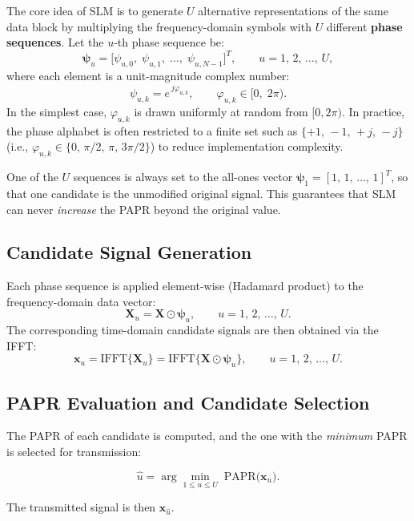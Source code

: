 The core idea of SLM is to generate $U$ alternative representations of the
same data block by multiplying the frequency-domain symbols with $U$ different
\textbf{phase sequences}.  Let the $u$-th phase sequence be:
\begin{equation*}
    \bm{\psi}_u = \bigl[\psi_{u,0},\;\psi_{u,1},\;\dots,\;\psi_{u,N-1}\bigr]^T,
    \qquad u = 1,\,2,\,\dots,\,U,
\end{equation*}
where each element is a unit-magnitude complex number:
\begin{equation*}
    \psi_{u,k} = e^{\,j\varphi_{u,k}},
    \qquad \varphi_{u,k} \in [0,\;2\pi).
\end{equation*}
In the simplest case, $\varphi_{u,k}$ is drawn uniformly at random
from $[0,2\pi)$.  In practice, the phase alphabet is often
restricted to a finite set such as $\{+1,\,-1,\,+j,\,-j\}$
(i.e., $\varphi_{u,k} \in \{0,\, \pi/2,\, \pi,\, 3\pi/2\}$)
to reduce implementation complexity.

\begin{keyinsight}
    One of the $U$ sequences is always set to the all-ones vector
    $\bm{\psi}_1 = [1,\,1,\,\dots,\,1]^T$, so that one candidate is the
    unmodified original signal.  This guarantees that SLM can never
    \emph{increase} the PAPR beyond the original value.
\end{keyinsight}

\subsection{Candidate Signal Generation}

Each phase sequence is applied element-wise (Hadamard product) to the
frequency-domain data vector:
\begin{equation*}
    \bm{X}_u = \bm{X} \odot \bm{\psi}_u,
    \qquad u = 1,\,2,\,\dots,\,U.
\end{equation*}
The corresponding time-domain candidate signals are then obtained via the
IFFT:
\begin{equation*}
    \bm{x}_u = \mathrm{IFFT}\{\bm{X}_u\}
             = \mathrm{IFFT}\{\bm{X} \odot \bm{\psi}_u\},
    \qquad u = 1,\,2,\,\dots,\,U.
\end{equation*}

\subsection{PAPR Evaluation and Candidate Selection}

The PAPR of each candidate is computed, and the one with the
\emph{minimum} PAPR is selected for transmission:
\begin{keyresult}
\begin{equation}
    \hat{u} = \arg\min_{1 \le u \le U}\;
    \mathrm{PAPR}\bigl(\bm{x}_u\bigr).
\end{equation}
\end{keyresult}
The transmitted signal is then $\bm{x}_{\hat{u}}$.

